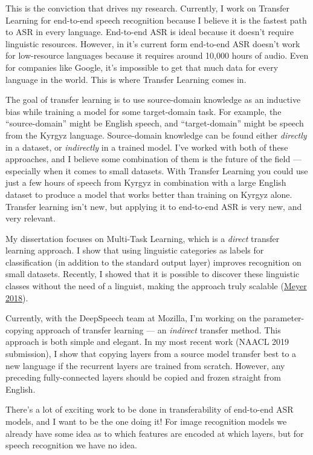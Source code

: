 \documentclass[12pt,a4paper]{article}
\begin{document}
This is the conviction that drives my research. Currently, I work on Transfer Learning for end-to-end speech recognition because I believe it is the fastest path to ASR in every language. End-to-end ASR is ideal because it doesn't require linguistic resources. However, in it's current form end-to-end ASR doesn't work for low-resource languages because it requires around 10,000 hours of audio. Even for companies like Google, it's impossible to get that much data for every language in the world. This is where Transfer Learning comes in.

The goal of transfer learning is to use source-domain knowledge as an inductive bias while training a model for some target-domain task. For example, the ``source-domain'' might be English speech, and ``target-domain'' might be speech from the Kyrgyz language. Source-domain knowledge can be found either \textit{directly} in a dataset, or \textit{indirectly} in a trained model. I've worked with both of these approaches, and I believe some combination of them is the future of the field --- especially when it comes to small datasets. With Transfer Learning you could use just a few hours of speech from Kyrgyz in combination with a large English dataset to produce a model that works better than training on Kyrgyz alone. Transfer learning isn't new, but applying it to end-to-end ASR is very new, and very relevant.

My dissertation focuses on Multi-Task Learning, which is a \textit{direct} transfer learning approach. I show that using linguistic categories as labels for classification (in addition to the standard output layer) improves recognition on small datasets. Recently, I showed that it is possible to discover these linguistic classes without the need of a linguist, making the approach truly scalable (\href{https://sites.google.com/view/mlslp/proceedings}{Meyer 2018}).

Currently, with the DeepSpeech team at Mozilla, I'm working on the parameter-copying approach of transfer learning --- an \textit{indirect} transfer method. This approach is both simple and elegant. In my most recent work (NAACL 2019 submission), I show that copying layers from a source model transfer best to a new language if the recurrent layers are trained from scratch. However, any preceding fully-connected layers should be copied and frozen straight from English.

There's a lot of exciting work to be done in transferability of end-to-end ASR models, and I want to be the one doing it! For image recognition models we already have some idea as to which features are encoded at which layers, but for speech recognition we have no idea.
\end{document}
